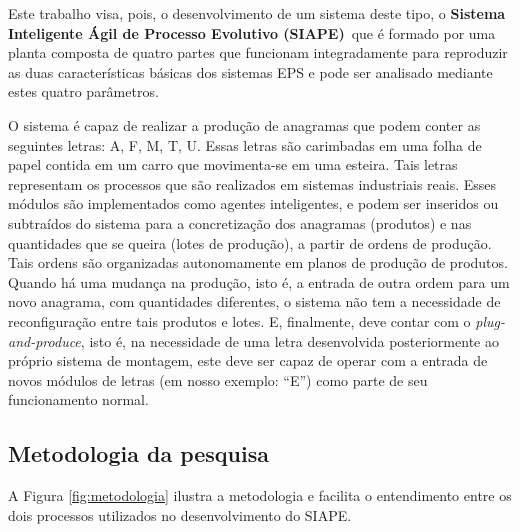 Este trabalho visa, pois, o desenvolvimento de um sistema deste tipo, o \textbf{Sistema Inteligente Ágil de Processo Evolutivo (SIAPE)}~que é formado por uma planta composta de quatro partes que funcionam integradamente para reproduzir as duas características básicas dos sistemas EPS e pode ser analisado mediante estes quatro parâmetros.

O sistema é capaz de realizar a produção de anagramas que podem conter as seguintes letras: A, F, M, T, U. Essas letras são carimbadas em uma folha de papel contida em um carro que movimenta-se em uma esteira. Tais letras representam os processos que são realizados em sistemas industriais reais. Esses módulos são implementados como agentes inteligentes, e podem ser inseridos ou subtraídos do sistema para a concretização dos anagramas (produtos) e nas quantidades que se queira (lotes de produção), a partir de ordens de produção. Tais ordens são organizadas autonomamente em planos de produção de produtos. Quando há uma mudança na produção, isto é, a entrada de outra ordem para um novo anagrama, com quantidades diferentes, o sistema não tem a necessidade de reconfiguração entre tais produtos e lotes. E, finalmente, deve contar com o \textit{plug-and-produce}, isto é, na necessidade de uma letra desenvolvida posteriormente ao próprio sistema de montagem, este deve ser capaz de operar com a entrada de novos módulos de letras (em nosso exemplo: ``E'') como parte de seu funcionamento normal.



\subsection{Metodologia da pesquisa}

A Figura \ref{fig:metodologia} ilustra a metodologia e facilita o entendimento entre os dois processos utilizados no desenvolvimento do SIAPE.

